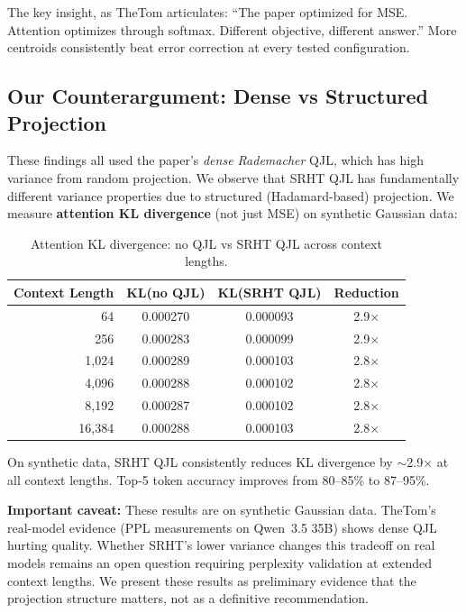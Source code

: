 \documentclass[11pt]{article}
\begin{document}
The key insight, as TheTom articulates: ``The paper optimized for MSE. Attention optimizes through softmax. Different objective, different answer.'' More centroids consistently beat error correction at every tested configuration.

\subsection{Our Counterargument: Dense vs Structured Projection}

These findings all used the paper's \emph{dense Rademacher} QJL, which has high variance from random projection. We observe that SRHT QJL has fundamentally different variance properties due to structured (Hadamard-based) projection. We measure \textbf{attention KL divergence} (not just MSE) on synthetic Gaussian data:

\begin{table}[h]
\centering
\caption{Attention KL divergence: no QJL vs SRHT QJL across context lengths.}
\label{tab:adaptive}
\begin{tabular}{@{}rccc@{}}
\toprule
Context Length & KL(no QJL) & KL(SRHT QJL) & Reduction \\
\midrule
64 & 0.000270 & 0.000093 & 2.9$\times$ \\
256 & 0.000283 & 0.000099 & 2.9$\times$ \\
1,024 & 0.000289 & 0.000103 & 2.8$\times$ \\
4,096 & 0.000288 & 0.000102 & 2.8$\times$ \\
8,192 & 0.000287 & 0.000102 & 2.8$\times$ \\
16,384 & 0.000288 & 0.000103 & 2.8$\times$ \\
\bottomrule
\end{tabular}
\end{table}

On synthetic data, SRHT QJL consistently reduces KL divergence by $\sim$2.9$\times$ at all context lengths. Top-5 token accuracy improves from 80--85\% to 87--95\%.

\textbf{Important caveat:} These results are on synthetic Gaussian data. TheTom's real-model evidence (PPL measurements on Qwen~3.5 35B) shows dense QJL hurting quality. Whether SRHT's lower variance changes this tradeoff on real models remains an open question requiring perplexity validation at extended context lengths. We present these results as preliminary evidence that the projection structure matters, not as a definitive recommendation.
\end{document}
